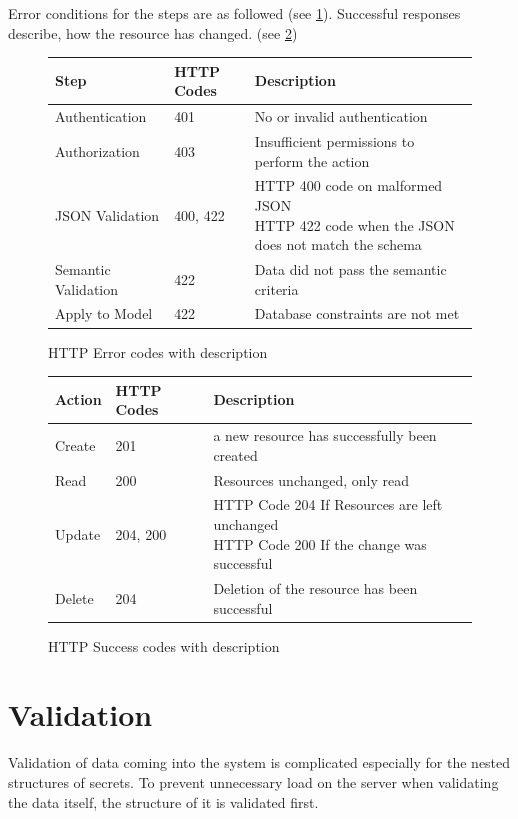 Error conditions for the steps are as followed (see \ref{tab:error_codes}).
Successful responses describe, how the resource has changed. (see
\ref{tab:success_codes})

\begin{figure}
  \begin{tabular}{|l|l|l|}
    \hline
    Step & HTTP Codes & Description \\ \hline
    Authentication & 401 & No or invalid authentication \\ \hline
    Authorization & 403 & Insufficient permissions to perform the action \\ \hline
    JSON Validation & 400, 422 & \parbox[t]{10cm}{HTTP 400 code on malformed JSON\\HTTP 422 code when the JSON does not match the schema} \\ \hline
    Semantic Validation & 422 & Data did not pass the semantic criteria \\ \hline
    Apply to Model & 422 & Database constraints are not met \\ \hline
  \end{tabular}
  \caption{HTTP Error codes with description}
  \centering
  \label{tab:error_codes}
\end{figure}

\begin{figure}
  \begin{tabular}{|l|l|l|}
    \hline
    Action & HTTP Codes & Description \\ \hline
    Create & 201 & a new resource has successfully been created \\ \hline
    Read & 200 & Resources unchanged, only read \\ \hline
    Update & 204, 200 & \parbox[t]{9cm}{HTTP Code 204 If Resources are left unchanged\\ HTTP Code 200 If the change was successful} \\ \hline
    Delete & 204 & Deletion of the resource has been successful \\ \hline
  \end{tabular}
  \caption{HTTP Success codes with description}
  \centering
  \label{tab:success_codes}
\end{figure}

\section{Validation}

Validation of data coming into the system is complicated especially for the
nested structures of secrets. To prevent unnecessary load on the server when
validating the data itself, the structure of it is validated first.


